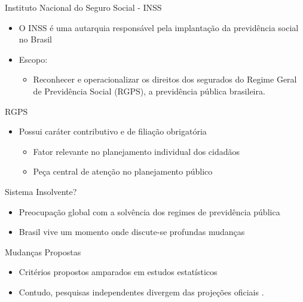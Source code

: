 \begin{frame}
  \begin{block}{Instituto Nacional do Seguro Social - INSS}
    \begin{itemize}
      \item O INSS é uma autarquia responsável pela implantação da previdência
      social no Brasil
      \item Escopo:
      \begin{itemize}
        \item Reconhecer e operacionalizar os direitos dos segurados do Regime
        Geral de Previdência Social (RGPS), a previdência pública brasileira.
      \end{itemize}
    \end{itemize}
  \end{block}
  \begin{block}{RGPS}
    \begin{itemize}
      \item Possui caráter contributivo e de filiação \alert{obrigatória}
      \begin{itemize}
        \item Fator relevante no planejamento individual dos cidadãos
        \item Peça central de atenção no planejamento público
      \end{itemize}
    \end{itemize}
  \end{block}
\end{frame}

\begin{frame}
  \begin{block}{Sistema Insolvente?}
    \begin{itemize}
      \item Preocupação global com a solvência dos regimes de previdência
      pública
      \item Brasil vive um momento onde discute-se \alert{profundas mudanças}
    \end{itemize}
  \end{block}
  \pause
  \begin{block}{Mudanças Propostas}
    \begin{itemize}
      \item Critérios propostos amparados em estudos estatísticos
      \item Contudo, pesquisas independentes divergem das projeções oficiais
      \cite{reformarparaexcluir}.
    \end{itemize}
  \end{block}
\end{frame}

